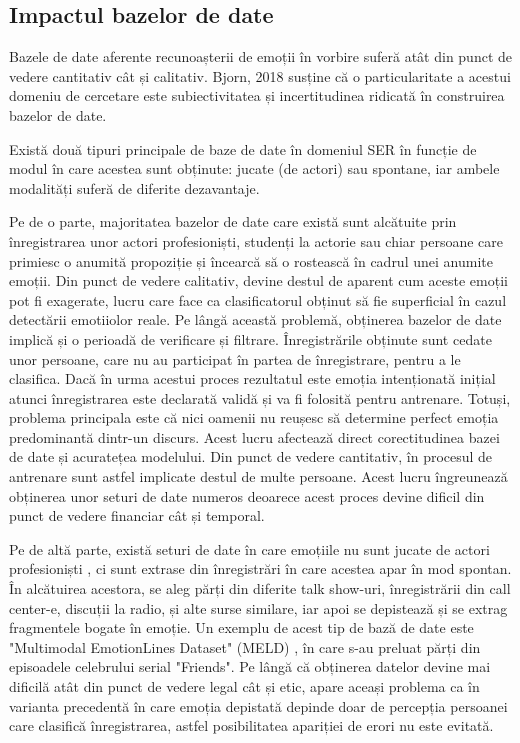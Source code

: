\documentclass[a4paper,12pt]{book}
\begin{document}
				\subsection{Impactul bazelor de date}
					Bazele de date aferente recunoașterii de emoții în vorbire suferă atât din punct de vedere cantitativ cât și calitativ. Bjorn, 2018 \cite{bjorn1} susține că o particularitate a acestui domeniu de cercetare este subiectivitatea și incertitudinea ridicată în construirea bazelor de date. \par 
					Există două tipuri principale de baze de date în domeniul SER în funcție de modul în care acestea sunt obținute: jucate (de actori) sau spontane, iar ambele modalități suferă de diferite dezavantaje. \par
					Pe de o parte, majoritatea bazelor de date care există sunt alcătuite prin înregistrarea unor actori profesioniști, studenți la actorie sau chiar persoane care primiesc o anumită propoziție și încearcă să o rostească în cadrul unei anumite emoții. Din punct de vedere calitativ, devine destul de aparent cum aceste emoții pot fi exagerate, lucru care face ca clasificatorul obținut să fie superficial în cazul detectării emotiiolor reale. Pe lângă această problemă, obținerea bazelor de date implică și o perioadă de verificare și filtrare. Înregistrările obținute sunt cedate unor persoane, care nu au participat în partea de înregistrare, pentru a le clasifica. Dacă în urma acestui proces rezultatul este emoția intenționată inițial atunci înregistrarea este declarată validă și va fi folosită pentru antrenare. Totuși, problema principala este că nici oamenii nu reușesc să determine perfect emoția predominantă dintr-un discurs. Acest lucru afectează direct corectitudinea bazei de date și acuratețea modelului. Din punct de vedere cantitativ, în procesul de antrenare sunt astfel implicate destul de multe persoane. Acest lucru îngreunează obținerea unor seturi de date numeros deoarece acest proces devine dificil din punct de vedere financiar cât și temporal.\par
					Pe de altă parte, există seturi de date în care emoțiile nu sunt jucate de actori profesioniști , ci sunt extrase din înregistrări în care acestea apar în mod spontan. În alcătuirea acestora, se aleg părți din diferite talk show-uri, înregistrării din call center-e, discuții la radio, și alte surse similare, iar apoi se depistează și se extrag fragmentele bogate în emoție. Un exemplu de acest tip de bază de date este "Multimodal EmotionLines Dataset" (MELD) \cite{meld}, în care s-au preluat părți din episoadele celebrului serial "Friends". Pe lângă că obținerea datelor devine mai dificilă atât din punct de vedere legal cât și etic, apare aceași problema ca în varianta precedentă în care emoția depistată depinde doar de percepția persoanei care clasifică înregistrarea, astfel posibilitatea apariției de erori nu este evitată. \par
\end{document}
